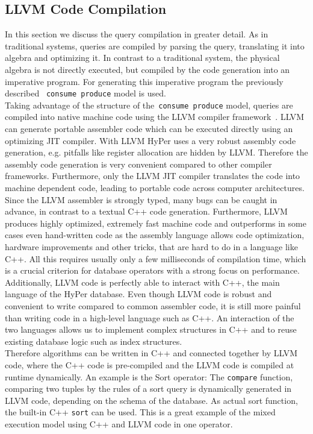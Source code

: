 \subsection{LLVM Code Compilation}

In this section we discuss the query compilation in greater detail. As in traditional systems, queries are compiled by parsing the query, translating it into algebra and optimizing it. In contrast to a traditional system, the physical algebra is not directly executed, but compiled by the code generation into an imperative program. For generating this imperative program the previously described ~\texttt{consume produce} model is used.
\\
Taking advantage of the structure of the~\texttt{consume produce} model, queries are compiled into native machine code using the LLVM compiler framework~\parencite{LLVM}. LLVM can generate portable assembler code which can be executed directly using an optimizing JIT compiler. With LLVM HyPer uses a very robust assembly code generation, e.g. pitfalls like register allocation are hidden by LLVM. Therefore the assembly code generation is very convenient compared to other compiler frameworks. Furthermore, only the LLVM JIT compiler translates the code into machine dependent code, leading to portable code across computer architectures. Since the LLVM assembler is strongly typed, many bugs can be caught in advance, in contrast to a textual C++ code generation. Furthermore, LLVM produces highly optimized, extremely fast machine code and outperforms in some cases even hand-written code as the assembly language allows code optimization, hardware improvements and other tricks, that are hard to do in a language like C++. All this requires usually only a few milliseconds of compilation time, which is a crucial criterion for database operators with a strong focus on performance.
\\
Additionally, LLVM code is perfectly able to interact with C++, the main language of the HyPer database. Even though LLVM code is robust and convenient to write compared to common assembler code, it is still more painful than writing code in a high-level language such as C++. An interaction of the two languages allows us to implement complex structures in C++ and to reuse existing database logic such as index structures. 
\\
Therefore algorithms can be written in C++ and connected together by LLVM code, where the C++ code is pre-compiled and the LLVM code is compiled at runtime dynamically. An example is the Sort operator: The \texttt{compare} function, comparing two tuples by the rules of a sort query is dynamically generated in LLVM code, depending on the schema of the database. As actual sort function, the built-in C++ \texttt{sort} can be used. This is a great example of the mixed execution model using C++ and LLVM code in one operator.
